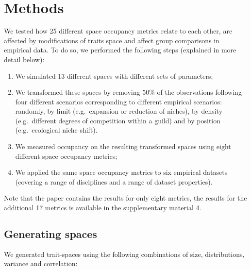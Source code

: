 \documentclass[]{article}
\providecommand{\tightlist}{%
  \setlength{\itemsep}{0pt}\setlength{\parskip}{0pt}}
\begin{document}
\section{Methods}\label{methods}

We tested how 25 different space occupancy metrics relate to each other,
are affected by modifications of traits space and affect group
comparisons in empirical data. To do so, we performed the following
steps (explained in more detail below):

\begin{enumerate}
\def\labelenumi{\arabic{enumi}.}
\tightlist
\item
  We simulated 13 different spaces with different sets of parameters;
\item
  We transformed these spaces by removing 50\% of the observations
  following four different scenarios corresponding to different
  empirical scenarios: randomly, by limit (e.g.~expansion or reduction
  of niches), by density (e.g.~different degrees of competition within a
  guild) and by position (e.g.~ecological niche shift).
\item
  We measured occupancy on the resulting transformed spaces using eight
  different space occupancy metrics;
\item
  We applied the same space occupancy metrics to six empirical datasets
  (covering a range of disciplines and a range of dataset properties).
\end{enumerate}

Note that the paper contains the results for only eight metrics, the
results for the additional 17 metrics is available in the supplementary
material 4.

\subsection{Generating spaces}\label{generating-spaces}

We generated trait-spaces using the following combinations of size,
distributions, variance and correlation:

\renewcommand\baselinestretch{1}\selectfont
\end{document}
